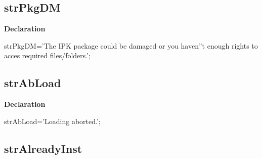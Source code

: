\documentclass{report}
\newif\ifpdf
\begin{document}
\subsection*{strPkgDM}
\fi
\label{trstrings-strPkgDM}
\begin{list}{}{
\setlength{\itemindent}{0cm}
\setlength{\listparindent}{0cm}
\setlength{\leftmargin}{\evensidemargin}
\addtolength{\leftmargin}{\tmplength}
\settowidth{\labelsep}{X}
\addtolength{\leftmargin}{\labelsep}
\setlength{\labelwidth}{\tmplength}
}
\item[\textbf{Declaration}\hfill]
\ifpdf
\begin{flushleft}
\fi
\begin{ttfamily}
strPkgDM='The IPK package could be damaged or you haven''t enough rights to acces required files/folders.';\end{ttfamily}

\ifpdf
\end{flushleft}
\fi

\end{list}
\ifpdf
\subsection*{\large{\textbf{strAbLoad}}\normalsize\hspace{1ex}\hrulefill}
\else
\subsection*{strAbLoad}
\fi
\label{trstrings-strAbLoad}
\begin{list}{}{
\setlength{\itemindent}{0cm}
\setlength{\listparindent}{0cm}
\setlength{\leftmargin}{\evensidemargin}
\addtolength{\leftmargin}{\tmplength}
\settowidth{\labelsep}{X}
\addtolength{\leftmargin}{\labelsep}
\setlength{\labelwidth}{\tmplength}
}
\item[\textbf{Declaration}\hfill]
\ifpdf
\begin{flushleft}
\fi
\begin{ttfamily}
strAbLoad='Loading aborted.';\end{ttfamily}

\ifpdf
\end{flushleft}
\fi

\end{list}
\ifpdf
\subsection*{\large{\textbf{strAlreadyInst}}\normalsize\hspace{1ex}\hrulefill}
\else
\end{document}
